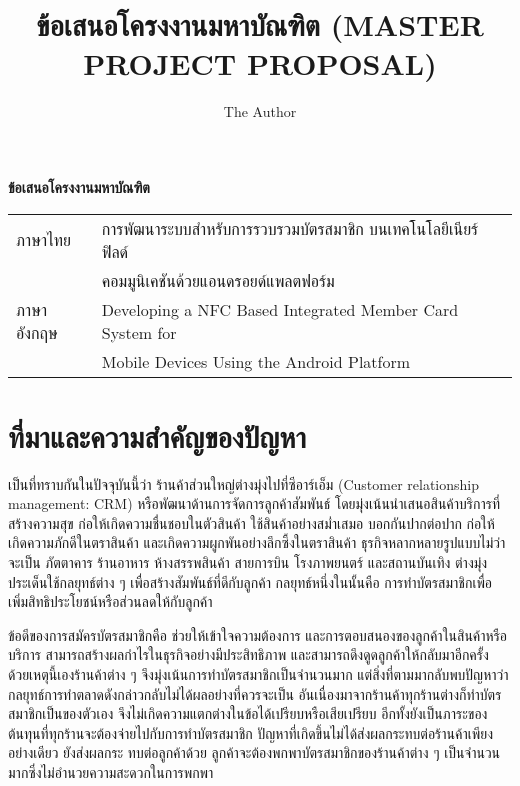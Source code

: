 \documentclass[a4paper]{article}
\title{ข้อเสนอโครงงานมหาบัณฑิต (MASTER PROJECT PROPOSAL)}
\author{The Author}
\newcommand{\MarginText}[1]{\marginpar{\raggedleft\itshape\small#1}} %
\newcommand{\Description}[1]{\hangindent=2em\hangafter=0\noindent\raggedright\footnotesize{#1}\par\normalsize\vspace{1em}}
\begin{document}

\begin{center}
{\huge \bf ข้อเสนอโครงงานมหาบัณฑิต}
\end{center}


\Large{\noindent\hspace{0.7cm}\setlength{\tabcolsep}{15pt}
\begin{tabular}{l l}    
	ภาษาไทย 	& การพัฒนาระบบสำหรับการรวบรวมบัตรสมาชิก บนเทคโนโลยีเนียร์ฟิลด์ \\
				& คอมมูนิเคชันด้วยแอนดรอยด์แพลตฟอร์ม \\
	ภาษาอังกฤษ	& Developing a NFC Based Integrated Member Card System for \\
				& Mobile Devices Using the Android Platform \\    
\end{tabular}
}

\section{ที่มาและความสำคัญของปัญหา}

เป็นที่ทราบกันในปัจจุบันนี้ว่า ร้านค้าส่วนใหญ่ต่างมุ่งไปที่ซีอาร์เอ็ม (Customer relationship management: CRM) หรือพัฒนาด้านการจัดการลูกค้าสัมพันธ์ โดยมุ่งเน้นนำเสนอสินค้าบริการที่สร้างความสุข ก่อให้เกิดความชื่นชอบในตัวสินค้า ใช้สินค้าอย่างสม่ำเสมอ บอกกันปากต่อปาก ก่อให้เกิดความภักดีในตราสินค้า และเกิดความผูกพันอย่างลึกซึ้งในตราสินค้า ธุรกิจหลากหลายรูปแบบไม่ว่าจะเป็น ภัตตาคาร ร้านอาหาร ห้างสรรพสินค้า สายการบิน โรงภาพยนตร์ และสถานบันเทิง ต่างมุ่งประเด็นใช้กลยุทธ์ต่าง ๆ เพื่อสร้างสัมพันธ์ที่ดีกับลูกค้า กลยุทธ์หนึ่งในนั้นคือ การทำบัตรสมาชิกเพื่อเพิ่มสิทธิประโยชน์หรือส่วนลดให้กับลูกค้า

ข้อดีของการสมัครบัตรสมาชิกคือ ช่วยให้เข้าใจความต้องการ และการตอบสนองของลูกค้าในสินค้าหรือบริการ สามารถสร้างผลกําไรในธุรกิจอย่างมีประสิทธิภาพ และสามารถดึงดูดลูกค้าให้กลับมาอีกครั้ง ด้วยเหตุนี้เองร้านค้าต่าง ๆ จึงมุ่งเน้นการทำบัตรสมาชิกเป็นจำนวนมาก แต่สิ่งที่ตามมากลับพบปัญหาว่ากลยุทธ์การทำตลาดดังกล่าวกลับไม่ได้ผลอย่างที่ควรจะเป็น อันเนื่องมาจากร้านค้าทุกร้านต่างก็ทำบัตรสมาชิกเป็นของตัวเอง จึงไม่เกิดความแตกต่างในข้อได้เปรียบหรือเสียเปรียบ อีกทั้งยังเป็นภาระของต้นทุนที่ทุกร้านจะต้องจ่ายไปกับการทำบัตรสมาชิก ปัญหาที่เกิดขึ้นไม่ได้ส่งผลกระทบต่อร้านค้าเพียงอย่างเดียว  ยังส่งผลกระ \newline ทบต่อลูกค้าด้วย ลูกค้าจะต้องพกพาบัตรสมาชิกของร้านค้าต่าง ๆ เป็นจำนวนมากซึ่งไม่อำนวยความสะดวกในการพกพา
\end{document}
